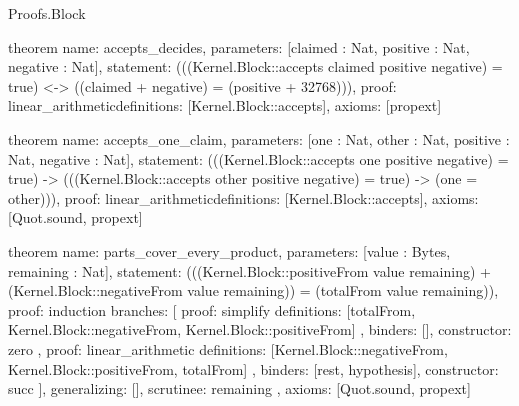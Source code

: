 \begin{lexlean}{Proofs.Block}
\begin{semanticmodule}
theorem{
  name: accepts_decides,
  parameters: [claimed : Nat, positive : Nat, negative : Nat],
  statement: (((Kernel.Block::accepts claimed positive negative) = true) <-> ((claimed + negative) = (positive + 32768))),
  proof: linear_arithmetic{definitions: [Kernel.Block::accepts]},
  axioms: [propext]
}

theorem{
  name: accepts_one_claim,
  parameters: [one : Nat, other : Nat, positive : Nat, negative : Nat],
  statement: (((Kernel.Block::accepts one positive negative) = true) -> (((Kernel.Block::accepts other positive negative) = true) -> (one = other))),
  proof: linear_arithmetic{definitions: [Kernel.Block::accepts]},
  axioms: [Quot.sound, propext]
}

theorem{
  name: parts_cover_every_product,
  parameters: [value : Bytes, remaining : Nat],
  statement: (((Kernel.Block::positiveFrom value remaining) + (Kernel.Block::negativeFrom value remaining)) = (totalFrom value remaining)),
  proof: induction{
    branches: [
      {
        proof: simplify{
          definitions: [totalFrom, Kernel.Block::negativeFrom, Kernel.Block::positiveFrom]
        },
        binders: [],
        constructor: zero
      },
      {
        proof: linear_arithmetic{
          definitions: [Kernel.Block::negativeFrom, Kernel.Block::positiveFrom, totalFrom]
        },
        binders: [rest, hypothesis],
        constructor: succ
      }
    ],
    generalizing: [],
    scrutinee: remaining
  },
  axioms: [Quot.sound, propext]
}
\end{semanticmodule}
\end{lexlean}
